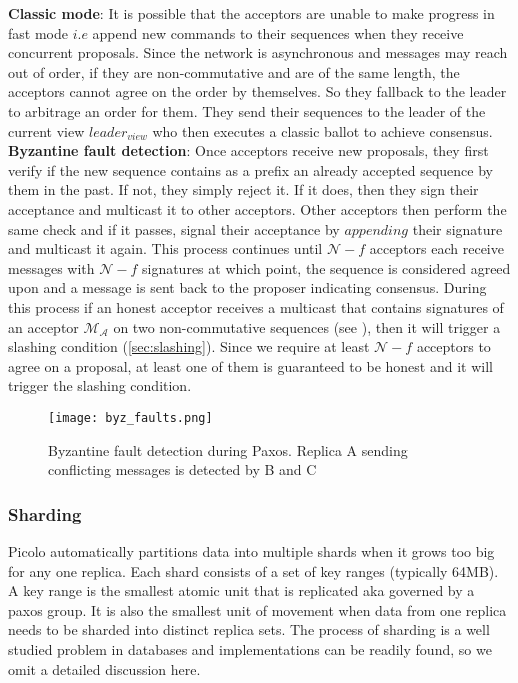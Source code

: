\newline\newline
\textbf{Classic mode}: It is possible that the acceptors are unable to make progress in fast mode $i.e$ append new commands to their sequences when they receive concurrent proposals. Since the network is asynchronous and messages may reach out of order, if they are non-commutative and are of the same length, the acceptors cannot agree on the order by themselves. So they fallback to the leader to arbitrage an order for them. They send their sequences to the leader of the current view $leader_{view}$ who then executes a classic ballot to achieve consensus.
\newline\newline
\textbf{Byzantine fault detection}: Once acceptors receive new proposals, they first verify if the new sequence contains as a prefix an already accepted sequence by them in the past. If not, they simply reject it. If it does, then they sign their acceptance and multicast it to other acceptors. Other acceptors then perform the same check and if it passes, signal their acceptance by $appending$ their signature and multicast it again. This process continues until $\mathcal{N} - f$ acceptors each receive messages with $\mathcal{N} - f$ signatures at which point, the sequence is considered agreed upon and a message is sent back to the proposer indicating consensus. During this process if an honest acceptor receives a multicast that contains signatures of an acceptor $\mathcal{M_A}$ on two non-commutative sequences (see ), then it will trigger a slashing condition (\cref{sec:slashing}). Since we require at least $\mathcal{N} - f$ acceptors to agree on a proposal, at least one of them is guaranteed to be honest and it will trigger the slashing condition. 
\begin{figure}[h!] \centering
	\texttt{[image: byz\_faults.png]}
	\caption{Byzantine fault detection during Paxos. Replica A sending conflicting messages is detected by B and C}
	\label{fig:byz_faults}
\end{figure}

\subsubsection{Sharding}
Picolo automatically partitions data into multiple shards when it grows too big for any one replica. Each shard consists of a set of key ranges (typically 64MB). A key range is the smallest atomic unit that is replicated aka governed by a paxos group. It is also the smallest unit of movement when data from one replica needs to be sharded into distinct replica sets. The process of sharding is a well studied problem in databases and implementations can be readily found, so we omit a detailed discussion here. 


